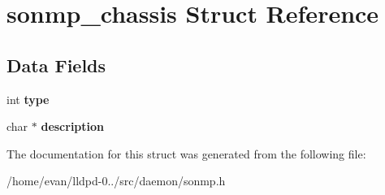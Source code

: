 \section{sonmp\-\_\-chassis \-Struct \-Reference}
\label{structsonmp__chassis}
\subsection*{\-Data \-Fields}
\begin{DoxyCompactItemize}
\item 
int {\bfseries type}\label{structsonmp__chassis_ac765329451135abec74c45e1897abf26}

\item 
char $\ast$ {\bfseries description}\label{structsonmp__chassis_a8444d6e0dfe2bbab0b5e7b24308f1559}

\end{DoxyCompactItemize}


\-The documentation for this struct was generated from the following file\-:\begin{DoxyCompactItemize}
\item 
/home/evan/lldpd-\/0../src/daemon/sonmp.\-h\end{DoxyCompactItemize}
